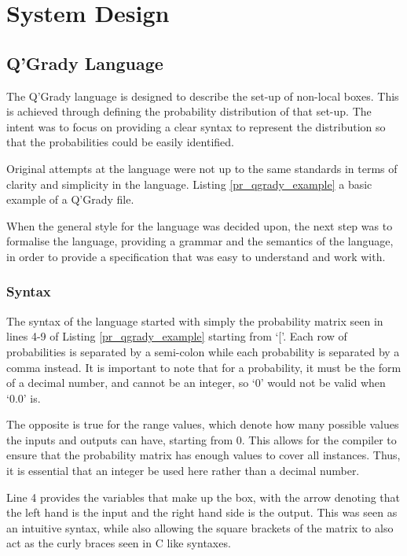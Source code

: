\documentclass[report.tex]{subfiles}
\begin{document}
\chapter{System Design} %
\label{cha:system_design}
\section{Q'Grady Language} %
\label{sec:q_grady_language}
The Q'Grady language is designed to describe the set-up of non-local boxes.
This is achieved through defining the probability distribution of that set-up.
The intent was to focus on providing a clear syntax to represent the
distribution so that the probabilities could be easily identified. 

Original attempts at the language were not up to the same standards in terms of
clarity and simplicity in the language. Listing \ref{pr_qgrady_example} a basic
example of a Q'Grady file.

 

When the general style for the language was decided upon, the next step was to
formalise the language, providing a grammar and the semantics of the language,
in order to provide a specification that was easy to understand and work with.

\subsection{Syntax} %
\label{sub:syntax}
The syntax of the language started with simply the probability matrix seen in
lines 4-9 of Listing \ref{pr_qgrady_example} starting from `['. Each row of
probabilities is separated by a semi-colon while each probability is separated
by a comma instead. It is important to note that for a probability, it must be
the form of a decimal number, and cannot be an integer, so `0' would not be
valid when `0.0' is.

The opposite is true for the range values, which denote how many possible values
the inputs and outputs can have, starting from 0. This allows for the compiler
to ensure that the probability matrix has enough values to cover all instances.
Thus, it is essential that an integer be used here rather than a decimal number.

Line 4 provides the variables that make up the box, with the arrow denoting that
the left hand is the input and the right hand side is the output. This was seen
as an intuitive syntax, while also allowing the square brackets of the matrix to
also act as the curly braces seen in C like syntaxes.
\end{document}
